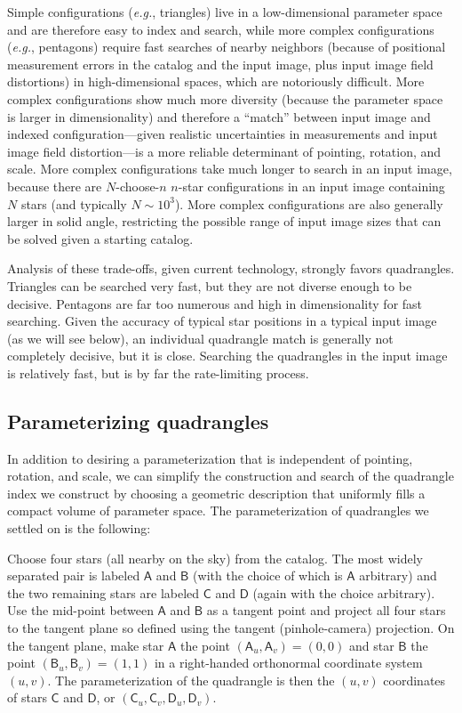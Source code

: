 \documentclass[12pt,preprint]{aastex}
\newcommand{\latin}[1]{\textit{#1}}
\newcommand{\eg}{\latin{e.g.}}
\newcommand{\starlabel}[1]{\mathsf{#1}}
\newcommand{\AAA}{\starlabel{A}}
\newcommand{\BBB}{\starlabel{B}}
\newcommand{\CCC}{\starlabel{C}}
\newcommand{\DDD}{\starlabel{D}}
\begin{document}
Simple configurations (\eg, triangles) live in a low-dimensional
parameter space and are therefore easy to index and search, while more
complex configurations (\eg, pentagons) require fast searches of
nearby neighbors (because of positional measurement errors in the
catalog and the input image, plus input image field distortions) in
high-dimensional spaces, which are notoriously difficult.  More
complex configurations show much more diversity (because the parameter
space is larger in dimensionality) and therefore a ``match'' between
input image and indexed configuration---given realistic uncertainties
in measurements and input image field distortion---is a more reliable
determinant of pointing, rotation, and scale.  More complex
configurations take much longer to search in an input image, because
there are $N$-choose-$n$ $n$-star configurations in an input image
containing $N$ stars (and typically $N\sim 10^3$).  More complex
configurations are also generally larger in solid angle, restricting
the possible range of input image sizes that can be solved given a
starting catalog.

Analysis of these trade-offs, given current technology, strongly
favors quadrangles.  Triangles can be searched very fast, but they are
not diverse enough to be decisive.  Pentagons are far too numerous and
high in dimensionality for fast searching.  Given the accuracy of
typical star positions in a typical input image (as we will see
below), an individual quadrangle match is generally not completely
decisive, but it is close.  Searching the quadrangles in the input
image is relatively fast, but is by far the rate-limiting process.

\subsection{Parameterizing quadrangles}

In addition to desiring a parameterization that is independent of
pointing, rotation, and scale, we can simplify the construction and
search of the quadrangle index we construct by choosing a geometric
description that uniformly fills a compact volume of parameter space.
The parameterization of quadrangles we settled on is the following:

Choose four stars (all nearby on the sky) from the catalog.  The most
widely separated pair is labeled $\AAA$ and $\BBB$ (with the choice of
which is $\AAA$ arbitrary) and the two remaining stars are labeled
$\CCC$ and $\DDD$ (again with the choice arbitrary).  Use the
mid-point between $\AAA$ and $\BBB$ as a tangent point and project all
four stars to the tangent plane so defined using the tangent
(pinhole-camera) projection.  On the tangent plane, make star $\AAA$
the point $(\AAA_u,\AAA_v)=(0,0)$ and star $\BBB$ the point
$(\BBB_u,\BBB_v)=(1,1)$ in a right-handed orthonormal coordinate
system $(u,v)$.  The parameterization of the quadrangle is then the
$(u,v)$ coordinates of stars $\CCC$ and $\DDD$, or
$(\CCC_u,\CCC_v,\DDD_u,\DDD_v)$.
\end{document}
